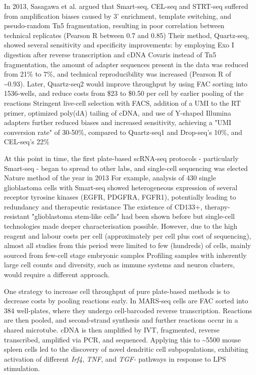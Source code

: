 In 2013, Sasagawa et al. argued that Smart-seq, CEL-seq and STRT-seq suffered from amplification biases caused by 3' enrichment, template switching, and pseudo-random Tn5 fragmentation, resulting in poor correlation between technical replicates (Pearson R between 0.7 and 0.85) Their method, Quartz-seq, showed several sensitivity and specificity improvements: by employing Exo I digestion after reverse transcription and cDNA Covaris instead of Tn5 fragmentation, the amount of adapter sequences present in the data was reduced from 21\% to 7\%, and technical reproducibility was increased (Pearson R of \textasciitilde{0.93}). Later, Quartz-seq2 would improve throughput by using FAC sorting into 1536-wells, and reduce costs from \$23 to \$0.50 per cell by earlier pooling of the reactions Stringent live-cell selection with FACS, addition of a UMI to the RT primer, optimized poly(dA) tailing of cDNA, and use of Y-shaped Illumina adapters further reduced biases and increased sensitivity, achieving a "UMI conversion rate" of 30-50\%, compared to Quartz-seq1 and Drop-seq's 10\%, and CEL-seq's 22\%

At this point in time, the first plate-based scRNA-seq protocols - particularly Smart-seq - began to spread to other labs, and single-cell sequencing was elected Nature method of the year in 2013 For example, analysis of \num{430} single glioblastoma cells with Smart-seq showed heterogeneous expression of several receptor tyrosine kinases (EGFR, PDGFRA, FGFR1), potentially leading to redundancy and therapeutic resistance The existence of CD133+, therapy-resistant "glioblastoma stem-like cells" had been shown before but single-cell technologies made deeper characterisation possible. However, due to the high reagent and labour costs per cell (approximately  per cell plus cost of sequencing), almost all studies from this period were limited to few (hundreds) of cells, mainly sourced from few-cell stage embryonic samples Profiling samples with inherently large cell counts and diversity, such as immune systems and neuron clusters, would require a different approach.

One strategy to increase cell throughput of pure plate-based methods is to decrease costs by pooling reactions early. In MARS-seq cells are FAC sorted into 384 well-plates, where they undergo cell-barcoded reverse transcription. Reactions are then pooled, and second-strand synthesis and further reactions occur in a shared microtube. cDNA is then amplified by IVT, fragmented, reverse transcribed, amplified via PCR, and sequenced. Applying this to \textasciitilde{\num{5500}} mouse spleen cells led to the discovery of novel dendritic cell subpopulations, exhibiting activation of different \textit{Irf4}, \textit{TNF}, and \textit{TGF-\textbeta} pathways in response to LPS stimulation.

